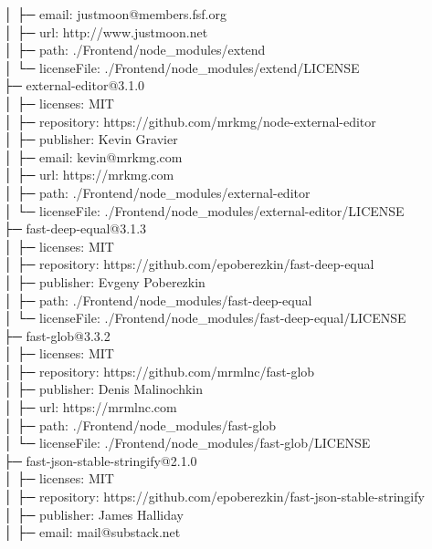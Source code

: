 \documentclass[
    paper=a4,
    twoside=false,
    parskip=half,
    listof=entryprefix,
    listof=totoc,
    index=totoc,
    bibliography=totoc,
    headsepline,
]{scrbook}
\begin{document}
    │  ├─ email: justmoon@members.fsf.org\\
    │  ├─ url: http://www.justmoon.net\\
    │  ├─ path: ./Frontend/node\_modules/extend\\
    │  └─ licenseFile: ./Frontend/node\_modules/extend/LICENSE\\
    ├─ external-editor@3.1.0\\
    │  ├─ licenses: MIT\\
    │  ├─ repository: https://github.com/mrkmg/node-external-editor\\
    │  ├─ publisher: Kevin Gravier\\
    │  ├─ email: kevin@mrkmg.com\\
    │  ├─ url: https://mrkmg.com\\
    │  ├─ path: ./Frontend/node\_modules/external-editor\\
    │  └─ licenseFile: ./Frontend/node\_modules/external-editor/LICENSE\\
    ├─ fast-deep-equal@3.1.3\\
    │  ├─ licenses: MIT\\
    │  ├─ repository: https://github.com/epoberezkin/fast-deep-equal\\
    │  ├─ publisher: Evgeny Poberezkin\\
    │  ├─ path: ./Frontend/node\_modules/fast-deep-equal\\
    │  └─ licenseFile: ./Frontend/node\_modules/fast-deep-equal/LICENSE\\
    ├─ fast-glob@3.3.2\\
    │  ├─ licenses: MIT\\
    │  ├─ repository: https://github.com/mrmlnc/fast-glob\\
    │  ├─ publisher: Denis Malinochkin\\
    │  ├─ url: https://mrmlnc.com\\
    │  ├─ path: ./Frontend/node\_modules/fast-glob\\
    │  └─ licenseFile: ./Frontend/node\_modules/fast-glob/LICENSE\\
    ├─ fast-json-stable-stringify@2.1.0\\
    │  ├─ licenses: MIT\\
    │  ├─ repository: https://github.com/epoberezkin/fast-json-stable-stringify\\
    │  ├─ publisher: James Halliday\\
    │  ├─ email: mail@substack.net\\
\end{document}
